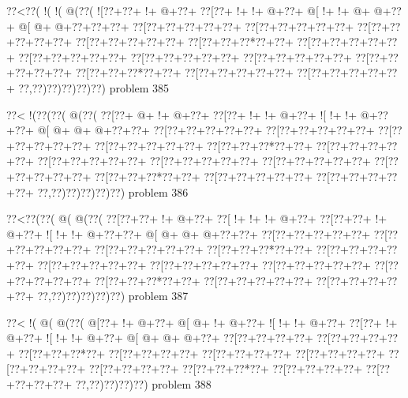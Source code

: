 \vbox{\vbox{\goo
\0??<\0??(\- !(\- !(\- @(\0??(
\- ![\0??+\0??+\- !+\- @+\0??+
\0??[\0??+\- !+\- !+\- @+\0??+
\- @[\- !+\- !+\- @+\- @+\0??+
\- @[\- @+\- @+\0??+\0??+\0??+
\0??[\0??+\0??+\0??+\0??+\0??+
\0??[\0??+\0??+\0??+\0??+\0??+
\0??[\0??+\0??+\0??+\0??+\0??+
\0??[\0??+\0??+\0??+\0??+\0??+
\0??[\0??+\0??+\0??*\0??+\0??+
\0??[\0??+\0??+\0??+\0??+\0??+
\0??[\0??+\0??+\0??+\0??+\0??+
\0??[\0??+\0??+\0??+\0??+\0??+
\0??[\0??+\0??+\0??+\0??+\0??+
\0??[\0??+\0??+\0??+\0??+\0??+
\0??[\0??+\0??+\0??*\0??+\0??+
\0??[\0??+\0??+\0??+\0??+\0??+
\0??[\0??+\0??+\0??+\0??+\0??+
\0??,\0??)\0??)\0??)\0??)\0??)
}
\hfil problem 385\hfil\break
}

\vbox{\vbox{\goo
\0??<\- !(\0??(\0??(\- @(\0??(
\0??[\0??+\- @+\- !+\- @+\0??+
\0??[\0??+\- !+\- !+\- @+\0??+
\- ![\- !+\- !+\- @+\0??+\0??+
\- @[\- @+\- @+\- @+\0??+\0??+
\0??[\0??+\0??+\0??+\0??+\0??+
\0??[\0??+\0??+\0??+\0??+\0??+
\0??[\0??+\0??+\0??+\0??+\0??+
\0??[\0??+\0??+\0??+\0??+\0??+
\0??[\0??+\0??+\0??*\0??+\0??+
\0??[\0??+\0??+\0??+\0??+\0??+
\0??[\0??+\0??+\0??+\0??+\0??+
\0??[\0??+\0??+\0??+\0??+\0??+
\0??[\0??+\0??+\0??+\0??+\0??+
\0??[\0??+\0??+\0??+\0??+\0??+
\0??[\0??+\0??+\0??*\0??+\0??+
\0??[\0??+\0??+\0??+\0??+\0??+
\0??[\0??+\0??+\0??+\0??+\0??+
\0??,\0??)\0??)\0??)\0??)\0??)
}
\hfil problem 386\hfil\break
}

\vbox{\vbox{\goo
\0??<\0??(\0??(\- @(\- @(\0??(
\0??[\0??+\0??+\- !+\- @+\0??+
\0??[\- !+\- !+\- !+\- @+\0??+
\0??[\0??+\0??+\- !+\- @+\0??+
\- ![\- !+\- !+\- @+\0??+\0??+
\- @[\- @+\- @+\- @+\0??+\0??+
\0??[\0??+\0??+\0??+\0??+\0??+
\0??[\0??+\0??+\0??+\0??+\0??+
\0??[\0??+\0??+\0??+\0??+\0??+
\0??[\0??+\0??+\0??*\0??+\0??+
\0??[\0??+\0??+\0??+\0??+\0??+
\0??[\0??+\0??+\0??+\0??+\0??+
\0??[\0??+\0??+\0??+\0??+\0??+
\0??[\0??+\0??+\0??+\0??+\0??+
\0??[\0??+\0??+\0??+\0??+\0??+
\0??[\0??+\0??+\0??*\0??+\0??+
\0??[\0??+\0??+\0??+\0??+\0??+
\0??[\0??+\0??+\0??+\0??+\0??+
\0??,\0??)\0??)\0??)\0??)\0??)
}
\hfil problem 387\hfil\break
}

\vbox{\vbox{\goo
\0??<\- !(\- @(\- @(\0??(
\- @[\0??+\- !+\- @+\0??+
\- @[\- @+\- !+\- @+\0??+
\- ![\- !+\- !+\- @+\0??+
\0??[\0??+\- !+\- @+\0??+
\- ![\- !+\- !+\- @+\0??+
\- @[\- @+\- @+\- @+\0??+
\0??[\0??+\0??+\0??+\0??+
\0??[\0??+\0??+\0??+\0??+
\0??[\0??+\0??+\0??*\0??+
\0??[\0??+\0??+\0??+\0??+
\0??[\0??+\0??+\0??+\0??+
\0??[\0??+\0??+\0??+\0??+
\0??[\0??+\0??+\0??+\0??+
\0??[\0??+\0??+\0??+\0??+
\0??[\0??+\0??+\0??*\0??+
\0??[\0??+\0??+\0??+\0??+
\0??[\0??+\0??+\0??+\0??+
\0??,\0??)\0??)\0??)\0??)
}
\hfil problem 388\hfil\break
}

